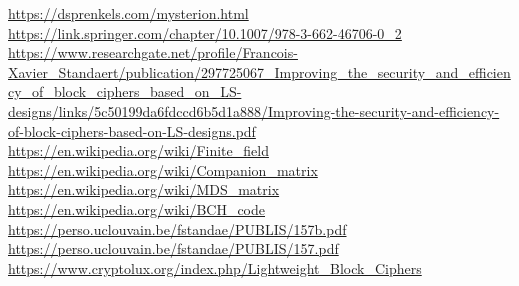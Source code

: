 \documentclass[preprint]{transcrypto}
\begin{document}


\begin{thebibliography}{9} 
  \url{https://dsprenkels.com/mysterion.html} 
    \url{https://link.springer.com/chapter/10.1007/978-3-662-46706-0_2}
   \url{https://www.researchgate.net/profile/Francois-Xavier_Standaert/publication/297725067_Improving_the_security_and_efficiency_of_block_ciphers_based_on_LS-designs/links/5c50199da6fdccd6b5d1a888/Improving-the-security-and-efficiency-of-block-ciphers-based-on-LS-designs.pdf}
    \url{https://en.wikipedia.org/wiki/Finite_field}
    \url{https://en.wikipedia.org/wiki/Companion_matrix}
   \url{https://en.wikipedia.org/wiki/MDS_matrix}
     \url{https://en.wikipedia.org/wiki/BCH_code}
     \url{https://perso.uclouvain.be/fstandae/PUBLIS/157b.pdf}
     \url{https://perso.uclouvain.be/fstandae/PUBLIS/157.pdf}
     \url{https://www.cryptolux.org/index.php/Lightweight_Block_Ciphers}
\end{thebibliography}


\end{document}
